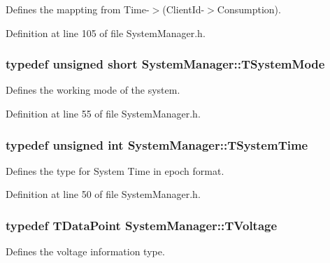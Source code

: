 Defines the mappting from Time-\/$>$(Client\-Id-\/$>$Consumption). 



Definition at line 105 of file System\-Manager.\-h.

\hypertarget{class_system_manager_aa32b3f50b8882c8aa7a9ca88ab7a43dd}{
\subsubsection[{T\-System\-Mode}]{\setlength{\rightskip}{0pt plus 5cm}typedef unsigned short {\bf System\-Manager\-::\-T\-System\-Mode}}}\label{class_system_manager_aa32b3f50b8882c8aa7a9ca88ab7a43dd}


Defines the working mode of the system. 



Definition at line 55 of file System\-Manager.\-h.

\hypertarget{class_system_manager_a9743ff4f23e7d957f5932780d8070099}{
\subsubsection[{T\-System\-Time}]{\setlength{\rightskip}{0pt plus 5cm}typedef unsigned int {\bf System\-Manager\-::\-T\-System\-Time}}}\label{class_system_manager_a9743ff4f23e7d957f5932780d8070099}


Defines the type for System Time in epoch format. 



Definition at line 50 of file System\-Manager.\-h.

\hypertarget{class_system_manager_a4194454c8c982c9e4d450e16625dd19c}{
\subsubsection[{T\-Voltage}]{\setlength{\rightskip}{0pt plus 5cm}typedef {\bf T\-Data\-Point} {\bf System\-Manager\-::\-T\-Voltage}}}\label{class_system_manager_a4194454c8c982c9e4d450e16625dd19c}


Defines the voltage information type. 



